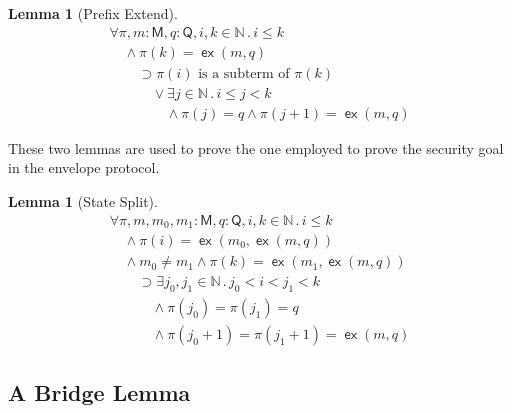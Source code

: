 \documentclass[12pt]{article}
\newtheorem{lem}[thm]{Lemma}
\newcommand{\cn}[1]{\ensuremath{\operatorname{\mathsf{#1}}}}
\newcommand{\srt}[1]{\ensuremath{\mathsf{#1}}}
\newcommand{\typ}{\mathbin:}
\newcommand{\nat}{\ensuremath{\mathbb{N}}}
\newcommand{\all}[1]{\forall#1\mathpunct.}
\newcommand{\some}[1]{\exists#1\mathpunct.}
\newcommand{\extend}{\cn{ex}}
\newcommand{\pth}{\ensuremath{\pi}}
\begin{document}

\begin{lem}[Prefix Extend]\label{lem:prefix extend}
\begingroup\rm
\[\begin{array}{l}
\all{\pth,m\typ\srt{M},q\typ\srt{Q},i,k\in\nat}i\leq k\\
\quad{}\land\pth(k)=\extend(m,q)\\
\qquad\supset\mbox{$\pth(i)$ is a subterm of $\pth(k)$}\\
\qquad\quad{}\lor\some{j\in\nat}
i\leq j<k\\
\qquad\qquad{}\land\pth(j)=q\land\pth(j+1)=\extend(m,q)
\end{array}\]
\endgroup
\end{lem}

These two lemmas are used to prove the one employed to prove the
security goal in the envelope protocol.


\begin{lem}[State Split]\label{lem:state split}
\begingroup\rm
$$\begin{array}{l}
\all{\pth,m,m_0,m_1\typ\srt{M},q\typ\srt{Q},i,k\in\nat}i\leq k\\
\quad{}\land\pth(i)=\extend(m_0,\extend(m,q))\\
\quad{}\land m_0\neq m_1\land\pth(k)=\extend(m_1,\extend(m,q))\\
\qquad\supset\some{j_0,j_1\in\nat}j_0<i<j_1<k\\
\qquad\quad{}\land\pth(j_0)=\pth(j_1)=q\\
\qquad\quad{}\land\pth(j_0+1)=\pth(j_1+1)=\extend(m,q)
\end{array}$$
\endgroup
\end{lem}

\subsection{A Bridge Lemma}\label{sec:bridge}
\end{document}
